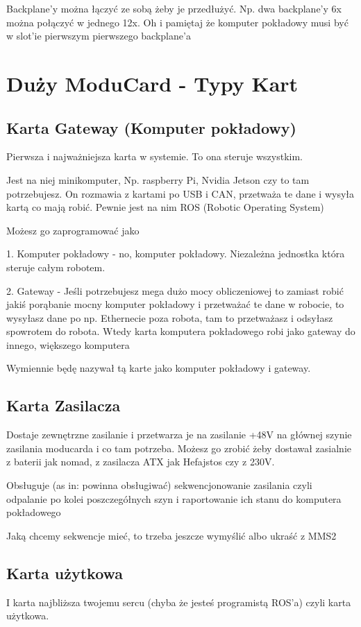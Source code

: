 \documentclass[b5paper, 10pt, twoside]{book}
\begin{document}
Backplane'y można łączyć ze sobą żeby je przedłużyć. Np. dwa backplane'y 6x można połączyć w jednego 12x. Oh i pamiętaj że komputer pokładowy musi być w slot'ie pierwszym pierwszego backplane'a

\section{Duży ModuCard - Typy Kart} \label{Duży Moducard - Typy Kart}
\subsection{Karta Gateway (Komputer pokładowy)}
Pierwsza i najważniejsza karta w systemie. To ona steruje wszystkim.

Jest na niej minikomputer, Np. raspberry Pi, Nvidia Jetson czy to tam potrzebujesz. On rozmawia z kartami po USB i CAN, przetważa te dane i wysyła kartą co mają robić. Pewnie jest na nim ROS (Robotic Operating System)

Możesz go zaprogramować jako

1. Komputer pokładowy - no, komputer pokładowy. Niezależna jednostka która steruje całym robotem.

2. Gateway - Jeśli potrzebujesz mega dużo mocy obliczeniowej to zamiast robić jakiś porąbanie mocny komputer pokładowy i przetważać te dane w robocie, to wysyłasz dane po np. Ethernecie poza robota, tam to przetważasz i odsyłasz spowrotem do robota. Wtedy karta komputera pokładowego robi jako gateway do innego, większego komputera

Wymiennie będę nazywał tą karte jako komputer pokładowy i gateway.

\subsection{Karta Zasilacza}
Dostaje zewnętrzne zasilanie i przetwarza je na zasilanie +48V na głównej szynie zasilania moducarda i co tam potrzeba. Możesz go zrobić żeby dostawał zasialnie z baterii jak nomad, z zasilacza ATX jak Hefajstos czy z 230V.

Obsługuje (as in: powinna obsługiwać) sekwencjonowanie zasilania czyli odpalanie po kolei poszczegółnych szyn i raportowanie ich stanu do komputera pokładowego

Jaką chcemy sekwencje mieć, to trzeba jeszcze wymyślić albo ukraść z MMS2

\subsection{Karta użytkowa}
I karta najbliższa twojemu sercu (chyba że jesteś programistą ROS'a) czyli karta użytkowa.
\end{document}
